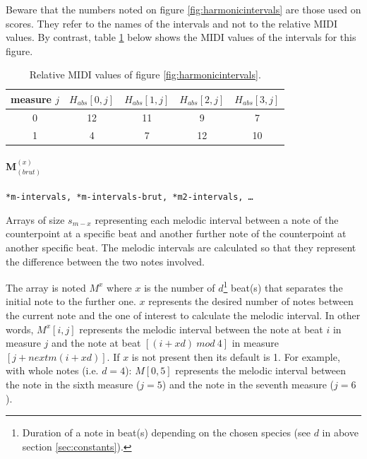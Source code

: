 Beware that the numbers noted on figure \ref{fig:harmonicintervals} are those used on scores. They refer to the names of the intervals and not to the relative MIDI values. By contrast, table \ref{tab:hjarrayvar} below shows the MIDI values of the intervals for this figure.

\begin{table}[h]
    \centering
    \begin{tabular}{|c||c|c|c|c|}
    \hline
    measure $j$ & $H_{abs}[0, j]$ & $H_{abs}[1, j]$ & $H_{abs}[2, j]$ & $H_{abs}[3, j]$ \\ \hline
    0 & 12 & 11 & 9 & 7 \\ \hline
    1 & 4 & 7 & 12 & 10 \\ \hline
    \end{tabular}
    \caption{Relative MIDI values of figure \ref{fig:harmonicintervals}.}
    \label{tab:hjarrayvar}
\end{table}

\paragraph{M$^{(x)}_{(brut)}$} %

\texttt{*m-intervals, *m-intervals-brut, *m2-intervals, \dots}

Arrays of size $s_{m-x}$ representing each melodic interval between a note of the counterpoint at a specific beat and another further note of the counterpoint at another specific beat. The melodic intervals are calculated so that they represent the difference between the two notes involved.

The array is noted $M^x$ where $x$ is the number of $d$\footnote{Duration of a note in beat(s) depending on the chosen species (see $d$ in above section \ref{sec:constants}).} beat(s) that separates the initial note to the further one. $x$ represents the desired number of notes between the current note and the one of interest to calculate the melodic interval. In other words, $M^x[i, j]$ represents the melodic interval between the note at beat $i$ in measure $j$ and the note at beat $[(i+xd)\ mod\ 4]$ in measure $[j+nextm(i+xd)]$. If $x$ is not present then its default is 1. For example, with whole notes (i.e. $d=4$): $M[0, 5]$ represents the melodic interval between the note in the sixth measure ($j=5$) and the note in the seventh measure ($j=6$).


